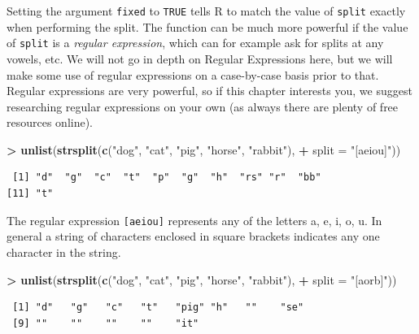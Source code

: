 \documentclass[]{krantz}
\makeatletter
\newenvironment{Shaded}{\begin{snugshade}}{\end{snugshade}}
\newcommand{\DataTypeTok}[1]{\textcolor[rgb]{0.27,0.27,0.27}{#1}}
\newcommand{\KeywordTok}[1]{\textcolor[rgb]{0.27,0.27,0.27}{\textbf{#1}}}
\newcommand{\NormalTok}[1]{#1}
\newcommand{\OperatorTok}[1]{\textcolor[rgb]{0.43,0.43,0.43}{\textbf{#1}}}
\newcommand{\StringTok}[1]{\textcolor[rgb]{0.5,0.5,0.5}{#1}}
\newenvironment{kframe}{%
\medskip{}
\setlength{\fboxsep}{.8em}
 \def\at@end@of@kframe{}%
 \ifinner\ifhmode%
  \def\at@end@of@kframe{\end{minipage}}%
  \begin{minipage}{\columnwidth}%
 \fi\fi%
 \def\FrameCommand##1{\hskip\@totalleftmargin \hskip-\fboxsep
 \colorbox{shadecolor}{##1}\hskip-\fboxsep
     \hskip-\linewidth \hskip-\@totalleftmargin \hskip\columnwidth}%
 \MakeFramed {\advance\hsize-\width
   \@totalleftmargin\z@ \linewidth\hsize
   \@setminipage}}%
 {\par\unskip\endMakeFramed%
 \at@end@of@kframe}
\renewenvironment{Shaded}{\begin{kframe}}{\end{kframe}}
\makeatother
\begin{document}
Setting the argument \texttt{fixed} to \texttt{TRUE} tells R to match the value of \texttt{split} exactly when performing the split. The function can be much more powerful if the value of \texttt{split} is a \emph{regular expression}, which can for example ask for splits at any vowels, etc. We will not go in depth on Regular Expressions here, but we will make some use of regular expressions on a case-by-case basis prior to that. Regular expressions are very powerful, so if this chapter interests you, we suggest researching regular expressions on your own (as always there are plenty of free resources online).

\begin{Shaded}
\begin{Highlighting}[]
\OperatorTok{>}\StringTok{ }\KeywordTok{unlist}\NormalTok{(}\KeywordTok{strsplit}\NormalTok{(}\KeywordTok{c}\NormalTok{(}\StringTok{"dog"}\NormalTok{, }\StringTok{"cat"}\NormalTok{, }\StringTok{"pig"}\NormalTok{, }\StringTok{"horse"}\NormalTok{, }\StringTok{"rabbit"}\NormalTok{), }
\OperatorTok{+}\StringTok{   }\DataTypeTok{split =} \StringTok{"[aeiou]"}\NormalTok{))}
\end{Highlighting}
\end{Shaded}

\begin{verbatim}
 [1] "d"  "g"  "c"  "t"  "p"  "g"  "h"  "rs" "r"  "bb"
[11] "t" 
\end{verbatim}

The regular expression \texttt{{[}aeiou{]}} represents any of the letters a, e, i, o, u. In general a string of characters enclosed in square brackets indicates any one character in the string.

\begin{Shaded}
\begin{Highlighting}[]
\OperatorTok{>}\StringTok{ }\KeywordTok{unlist}\NormalTok{(}\KeywordTok{strsplit}\NormalTok{(}\KeywordTok{c}\NormalTok{(}\StringTok{"dog"}\NormalTok{, }\StringTok{"cat"}\NormalTok{, }\StringTok{"pig"}\NormalTok{, }\StringTok{"horse"}\NormalTok{, }\StringTok{"rabbit"}\NormalTok{), }
\OperatorTok{+}\StringTok{   }\DataTypeTok{split =} \StringTok{"[aorb]"}\NormalTok{))}
\end{Highlighting}
\end{Shaded}

\begin{verbatim}
 [1] "d"   "g"   "c"   "t"   "pig" "h"   ""    "se" 
 [9] ""    ""    ""    ""    "it" 
\end{verbatim}
\end{document}
